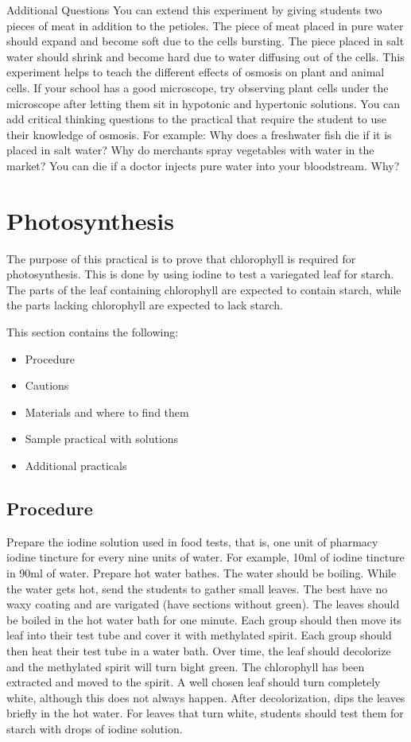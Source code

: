 \begin{enumerate}
Additional Questions
	You can extend this experiment by giving students two pieces of meat in addition to the petioles. The piece of meat placed in pure water should expand and become soft due to the cells bursting. The piece placed in salt water should shrink and become hard due to water diffusing out of the cells. This experiment helps to teach the different effects of osmosis on plant and animal cells.
	If your school has a good microscope, try observing plant cells under the microscope after letting them sit in hypotonic and hypertonic solutions. 
	You can add critical thinking questions to the practical that require the student to use their knowledge of osmosis. For example:
Why does a freshwater fish die if it is placed in salt water?
Why do merchants spray vegetables with water in the market?
You can die if a doctor injects pure water into your bloodstream. Why?

\section{Photosynthesis}

The purpose of this practical is to prove that chlorophyll is required for photosynthesis. This is done by using iodine to test a variegated leaf for starch. The parts of the leaf containing chlorophyll are expected to contain starch, while the parts lacking chlorophyll are expected to lack starch.

This section contains the following:
\begin{itemize}
\item{Procedure}
\item{Cautions}
\item{Materials and where to find them}
\item{Sample practical with solutions}
\item{Additional practicals}
\end{itemize}

\subsection{Procedure}
Prepare the iodine solution used in food tests, that is, one unit of pharmacy iodine tincture for every nine units of water. For example, 10ml of iodine tincture in 90ml of water.
Prepare hot water bathes. The water should be boiling.
While the water gets hot, send the students to gather small leaves. The best have no waxy coating and are varigated (have sections without green).
The leaves should be boiled in the hot water bath for one minute.
Each group should then move its leaf into their test tube and cover it with methylated spirit.
Each group should then heat their test tube in a water bath. Over time, the leaf should decolorize and the methylated spirit will turn bight green. The chlorophyll has been extracted and moved to the spirit. A well chosen leaf should turn completely white, although this does not always happen.
After decolorization, dips the leaves briefly in the hot water.
For leaves that turn white, students should test them for starch with drops of iodine solution.


\end{enumerate}
